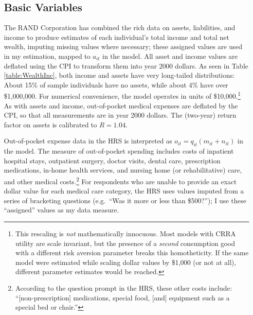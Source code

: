 \documentclass[12pt,pdftex,letterpaper]{article}
\newcommand{\Care}{m}
\newcommand{\Invst}{n}
\newcommand{\Assets}{a}
\newcommand{\Rfree}{R}
\newcommand{\Copay}{q}
\newcommand{\OOP}{o}
\begin{document}
\subsection{Basic Variables}

The RAND Corporation has combined the rich data on assets, liabilities, and income to produce estimates of each individual's total income and total net wealth, imputing missing values where necessary; these assigned values are used in my estimation, mapped to $\Assets_{it}$ in the model.  All asset and income values are deflated using the CPI to transform them into year 2000 dollars.  As seen in Table \ref{table:WealthInc}, both income and assets have very long-tailed distributions: About 15\% of sample individuals have no assets, while about 4\% have over \$1,000,000.  For numerical convenience, the model operates in units of \$10,000.\footnote{This rescaling is \textit{not} mathematically innocuous.  Most models with CRRA utility are scale invariant, but the presence of a \textit{second} consumption good with a different risk aversion parameter breaks this homotheticity.  If the same model were estimated while scaling dollar values by \$1,000 (or not at all), different parameter estimates would be reached.}  As with assets and income, out-of-pocket medical expenses are deflated by the CPI, so that all measurements are in year 2000 dollars.  The (two-year) return factor on assets is calibrated to $\Rfree = 1.04$.

Out-of-pocket expense data in the HRS is interpreted as $\OOP_{it} = \Copay_{it}(\Care_{it} + \Invst_{it})$ in the model.  The measure of out-of-pocket spending includes costs of inpatient hospital stays, outpatient surgery, doctor visits, dental care, prescription medications, in-home health services, and nursing home (or rehabilitative) care, and other medical costs.\footnote{According to the question prompt in the HRS, these other costs include: ``[non-prescription] medications, special food, [and] equipment such as a special bed or chair.''} For respondents who are unable to provide an exact dollar value for each medical care category, the HRS uses values imputed from a series of bracketing questions (e.g.\ ``Was it more or less than \$500?''); I use these ``assigned'' values as my data measure.
\end{document}
